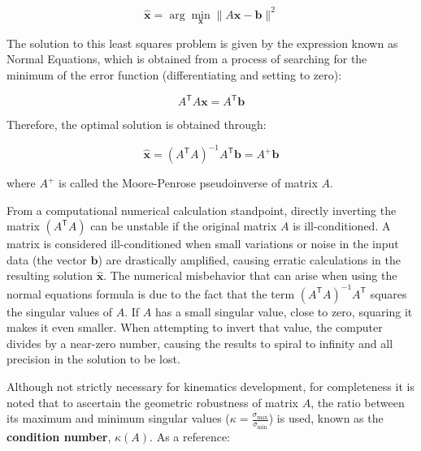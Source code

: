 \documentclass[11pt,a4paper]{article}
\newcommand{\trans}{\mathsf{T}}      %
\begin{document}
\begin{equation}
    \hat{\mathbf{x}} = \arg\min_{\mathbf{x}} \|A\mathbf{x} - \mathbf{b}\|^2
\end{equation}

The solution to this least squares problem is given by the expression known as Normal Equations, which is obtained from a process of searching for the minimum of the error function (differentiating and setting to zero):

\begin{equation}
    A^{\trans} A \mathbf{x} = A^{\trans} \mathbf{b}
\end{equation}

Therefore, the optimal solution is obtained through:

\begin{equation}
    \hat{\mathbf{x}} = (A^{\trans}A)^{-1}A^{\trans}\mathbf{b} = A^+\mathbf{b}
\end{equation}

where \(A^+\) is called the Moore-Penrose pseudoinverse of matrix \(A\).

From a computational numerical calculation standpoint, directly inverting the matrix \((A^{\trans}A)\) can be unstable if the original matrix \(A\) is ill-conditioned. A matrix is considered ill-conditioned when small variations or noise in the input data (the vector \(\mathbf{b}\)) are drastically amplified, causing erratic calculations in the resulting solution \(\hat{\mathbf{x}}\). The numerical misbehavior that can arise when using the normal equations formula is due to the fact that the term \((A^{\trans}A)^{-1}\allowbreak A^{\trans}\) squares the singular values of \(A\). If \(A\) has a small singular value, close to zero, squaring it makes it even smaller. When attempting to invert that value, the computer divides by a near-zero number, causing the results to spiral to infinity and all precision in the solution to be lost.

Although not strictly necessary for kinematics development, for completeness it is noted that to ascertain the geometric robustness of matrix \(A\), the ratio between its maximum and minimum singular values (\(\kappa = \frac{\sigma_{\max}}{\sigma_{\min}}\)) is used, known as the \textbf{condition number}, \(\kappa(A)\). As a reference:
\end{document}
